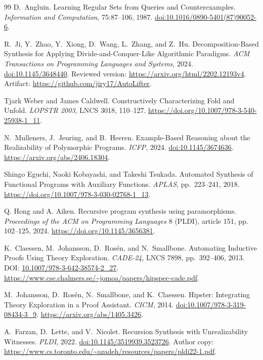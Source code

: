 \begin{thebibliography}{99}
 D.~Angluin. Learning Regular Sets from Queries and Counterexamples.
\emph{Information and Computation}, 75:87--106, 1987.
\href{https://doi.org/10.1016/0890-5401(87)90052-6}{doi:10.1016/0890-5401(87)90052-6}.

 R.~Ji, Y.~Zhao, Y.~Xiong, D.~Wang, L.~Zhang, and Z.~Hu.
Decomposition-Based Synthesis for Applying Divide-and-Conquer-Like Algorithmic
Paradigms. \emph{ACM Transactions on Programming Languages and Systems}, 2024.
\href{https://doi.org/10.1145/3648440}{doi:10.1145/3648440}.
Reviewed version: \url{https://arxiv.org/html/2202.12193v4}.
Artifact: \url{https://github.com/jiry17/AutoLifter}.

 Tjark Weber and James Caldwell. Constructively Characterizing Fold and Unfold.
\emph{LOPSTR 2003}, LNCS 3018, 110--127.
\url{https://doi.org/10.1007/978-3-540-25938-1_11}.

 N.~Mulleners, J.~Jeuring, and B.~Heeren.
Example-Based Reasoning about the Realizability of Polymorphic Programs.
\emph{ICFP}, 2024.
\href{https://doi.org/10.1145/3674636}{doi:10.1145/3674636}.
\url{https://arxiv.org/abs/2406.18304}.

 Shingo Eguchi, Naoki Kobayashi, and Takeshi Tsukada.
Automated Synthesis of Functional Programs with Auxiliary Functions.
\emph{APLAS}, pp.~223--241, 2018.
\url{https://doi.org/10.1007/978-3-030-02768-1_13}.

 Q. Hong and A. Aiken.
Recursive program synthesis using paramorphisms.
\emph{Proceedings of the ACM on Programming Languages} 8 (PLDI), article 151, pp. 102--125, 2024.
\url{https://doi.org/10.1145/3656381}.

 K.~Claessen, M.~Johansson, D.~Ros\'en, and N.~Smallbone. Automating Inductive
Proofs Using Theory Exploration. \emph{CADE-24}, LNCS 7898, pp.~392--406, 2013.
DOI: \href{https://doi.org/10.1007/978-3-642-38574-2_27}{10.1007/978-3-642-38574-2\_27}.
\url{https://www.cse.chalmers.se/~jomoa/papers/hipspec-cade.pdf}.

 M.~Johansson, D.~Ros\'en, N.~Smallbone, and K.~Claessen.
Hipster: Integrating Theory Exploration in a Proof Assistant.
\emph{CICM}, 2014.
\href{https://doi.org/10.1007/978-3-319-08434-3_9}{doi:10.1007/978-3-319-08434-3\_9}.
\url{https://arxiv.org/abs/1405.3426}.

 A.~Farzan, D.~Lette, and V.~Nicolet.
Recursion Synthesis with Unrealizability Witnesses.
\emph{PLDI}, 2022.
\href{https://doi.org/10.1145/3519939.3523726}{doi:10.1145/3519939.3523726}.
Author copy: \url{https://www.cs.toronto.edu/~azadeh/resources/papers/pldi22-1.pdf}.


\end{thebibliography}
